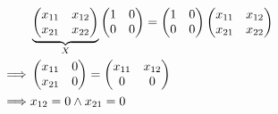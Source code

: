 \begin{itemize}
\begin{enumerate}[label=\alph*)]
\begin{itemize}
                    \begin{align*}
                        & \underbrace{%
                        \begin{pmatrix}
                            x_{11} & x_{12} \\
                            x_{21} & x_{22}
                        \end{pmatrix}}_{X} 
                        \begin{pmatrix}
                            1 & 0 \\
                            0 & 0
                        \end{pmatrix}
                        =
                        \begin{pmatrix}
                            1 & 0 \\
                            0 & 0
                        \end{pmatrix}
                        \begin{pmatrix}
                            x_{11} & x_{12} \\
                            x_{21} & x_{22}
                        \end{pmatrix} \\
                        \implies &
                        \begin{pmatrix}
                            x_{11} & 0 \\
                            x_{21} & 0
                        \end{pmatrix}
                        =
                        \begin{pmatrix}
                            x_{11} & x_{12} \\
                            0 & 0
                        \end{pmatrix} \\
                        \implies& x_{12} = 0 \wedge x_{21}= 0 \\
                    \end{align*}


\end{itemize}
\end{enumerate}
\end{itemize}
